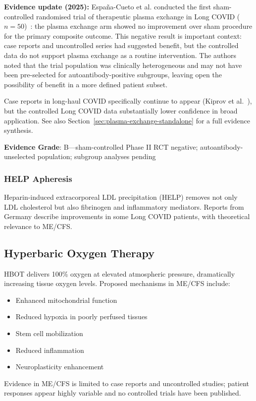 \textbf{Evidence update (2025):} España-Cueto et al. conducted the first sham-controlled randomised trial of therapeutic plasma exchange in Long COVID ($n = 50$)~\cite{EspanaCueto2025plasmaexchange}: the plasma exchange arm showed no improvement over sham procedure for the primary composite outcome. This negative result is important context: case reports and uncontrolled series had suggested benefit, but the controlled data do not support plasma exchange as a routine intervention. The authors noted that the trial population was clinically heterogeneous and may not have been pre-selected for autoantibody-positive subgroups, leaving open the possibility of benefit in a more defined patient subset.

Case reports in long-haul COVID specifically continue to appear (Kiprov et al.~\cite{Kiprov2021plasmapheresis}), but the controlled Long COVID data substantially lower confidence in broad application. See also Section~\ref{sec:plasma-exchange-standalone} for a full evidence synthesis.

\textbf{Evidence Grade}: B---sham-controlled Phase II RCT negative; autoantibody-unselected population; subgroup analyses pending

\subsubsection{HELP Apheresis}

Heparin-induced extracorporeal LDL precipitation (HELP) removes not only LDL cholesterol but also fibrinogen and inflammatory mediators. Reports from Germany describe improvements in some Long COVID patients, with theoretical relevance to ME/CFS.

\subsection{Hyperbaric Oxygen Therapy}

HBOT delivers 100\% oxygen at elevated atmospheric pressure, dramatically increasing tissue oxygen levels. Proposed mechanisms in ME/CFS include:
\begin{itemize}
    \item Enhanced mitochondrial function
    \item Reduced hypoxia in poorly perfused tissues
    \item Stem cell mobilization
    \item Reduced inflammation
    \item Neuroplasticity enhancement
\end{itemize}
Evidence in ME/CFS is limited to case reports and uncontrolled studies; patient responses appear highly variable and no controlled trials have been published.


